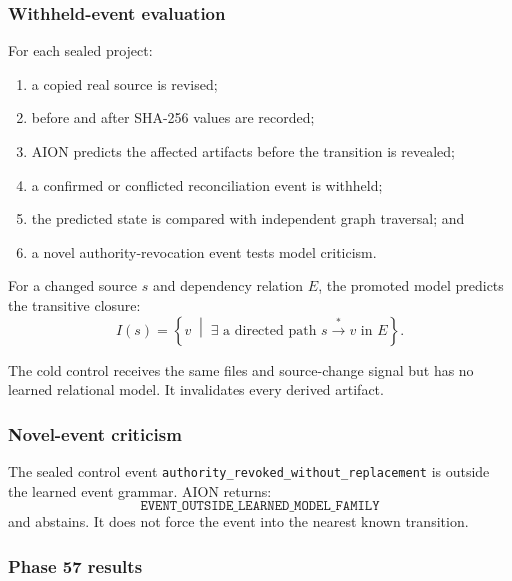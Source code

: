 \subsubsection{Withheld-event evaluation}

For each sealed project:
\begin{enumerate}
    \item a copied real source is revised;
    \item before and after SHA-256 values are recorded;
    \item AION predicts the affected artifacts before the transition is
    revealed;
    \item a confirmed or conflicted reconciliation event is withheld;
    \item the predicted state is compared with independent graph traversal;
    and
    \item a novel authority-revocation event tests model criticism.
\end{enumerate}

For a changed source \(s\) and dependency relation \(E\), the promoted model
predicts the transitive closure:
\[
I(s)
=
\left\{
v\;\middle|\;
\exists\text{ a directed path }s\xrightarrow{*}v\text{ in }E
\right\}.
\]

The cold control receives the same files and source-change signal but has no
learned relational model.  It invalidates every derived artifact.

\subsubsection{Novel-event criticism}

The sealed control event
\texttt{authority\_revoked\_without\_replacement} is outside the learned
event grammar.  AION returns:
\[
\texttt{EVENT\_OUTSIDE\_LEARNED\_MODEL\_FAMILY}
\]
and abstains.  It does not force the event into the nearest known transition.

\subsubsection{Phase 57 results}

